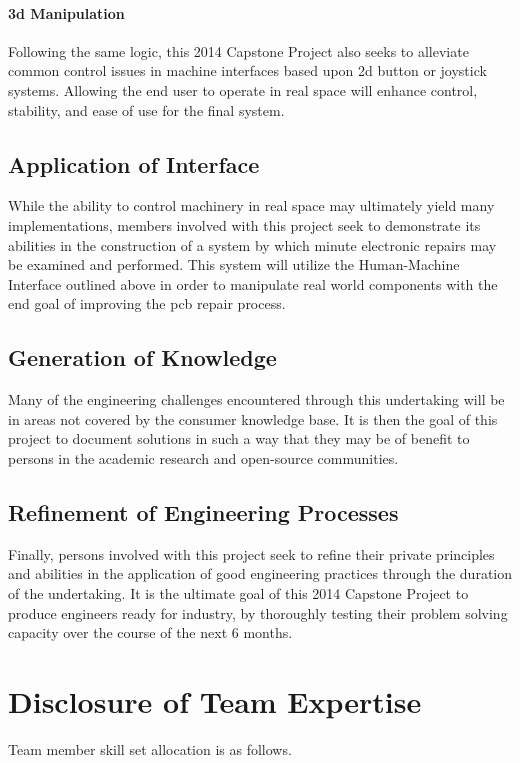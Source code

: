 \documentclass[11pt]{report}
\begin{document}
\paragraph{\gls{3d} Manipulation}
Following the same logic, this 2014 Capstone Project also seeks to alleviate common control issues in machine interfaces based upon \gls{2d} button or joystick systems.
Allowing the end user to operate in real space will enhance control, stability, and ease of use for the final system.

\subsection{Application of Interface}
While the ability to control machinery in real space may ultimately yield many implementations, members involved with this project seek to demonstrate its abilities in the construction of a system by which minute electronic repairs may be examined and performed.
This system will utilize the Human-Machine Interface outlined above in order to manipulate real world components with the end goal of improving the \gls{pcb} repair process.

\subsection{Generation of Knowledge}
Many of the engineering challenges encountered through this undertaking will be in areas not covered by the consumer knowledge base.
It is then the goal of this project to document solutions in such a way that they may be of benefit to persons in the academic research and open-source communities.

\subsection{Refinement of Engineering Processes}
Finally, persons involved with this project seek to refine their private principles and abilities in the application of good engineering practices through the duration of the undertaking.
It is the ultimate goal of this 2014 Capstone Project to produce engineers ready for industry, by thoroughly testing their problem solving capacity over the course of the next 6 months.

\section{Disclosure of Team Expertise}
Team member skill set allocation is as follows.
\end{document}
